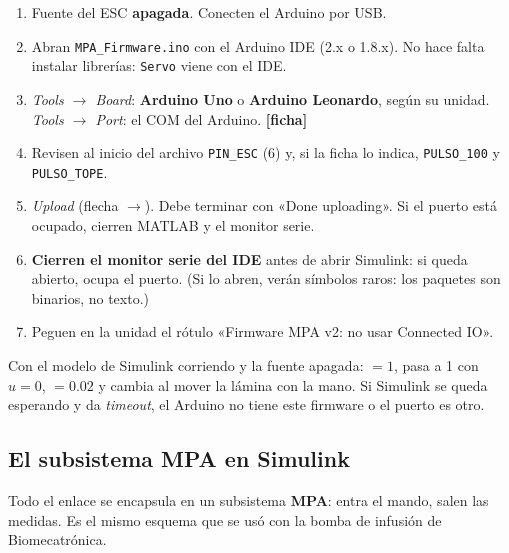 \documentclass[11pt,letterpaper]{article}
\newcommand{\blq}[1]{\textsf{\textbf{#1}}}                 %
\newcommand{\sen}[1]{\texttt{\detokenize{#1}}}             %
\newcommand{\ficha}{\textcolor{verdeOK}{\textbf{[ficha]}}}  %
\begin{document}
\begin{pasos}
\begin{enumerate}[leftmargin=14pt]
  \item Fuente del ESC \textbf{apagada}. Conecten el Arduino por USB.
  \item Abran \texttt{MPA\_Firmware.ino} con el Arduino IDE (2.x o 1.8.x). No hace falta instalar librerías: \texttt{Servo} viene con el IDE.
  \item \emph{Tools $\to$ Board}: \textbf{Arduino Uno} o \textbf{Arduino Leonardo}, según su unidad. \emph{Tools $\to$ Port}: el COM del Arduino. \ficha
  \item Revisen al inicio del archivo \texttt{PIN\_ESC} (6) y, si la ficha lo indica, \texttt{PULSO\_100} y \texttt{PULSO\_TOPE}.
  \item \emph{Upload} (flecha $\to$). Debe terminar con «Done uploading». Si el puerto está ocupado, cierren MATLAB y el monitor serie.
  \item \textbf{Cierren el monitor serie del IDE} antes de abrir Simulink: si queda abierto, ocupa el puerto. (Si lo abren, verán símbolos raros: los paquetes son binarios, no texto.)
  \item Peguen en la unidad el rótulo «Firmware MPA v2: no usar Connected IO».
\end{enumerate}
\end{pasos}

\begin{nota}
Con el modelo de Simulink corriendo y la fuente apagada: \sen{valido} $=1$, \sen{estado} pasa a 1 con $u=0$, \sen{diff(t_ard)} $=0.02$ y \sen{adc} cambia al mover la lámina con la mano. Si Simulink se queda esperando y da \emph{timeout}, el Arduino no tiene este firmware o el puerto es otro.
\end{nota}

\subsection{El subsistema MPA en Simulink}

Todo el enlace se encapsula en un subsistema \blq{MPA}: entra el mando, salen las medidas. Es el mismo esquema que se usó con la bomba de infusión de Biomecatrónica.
\end{document}
